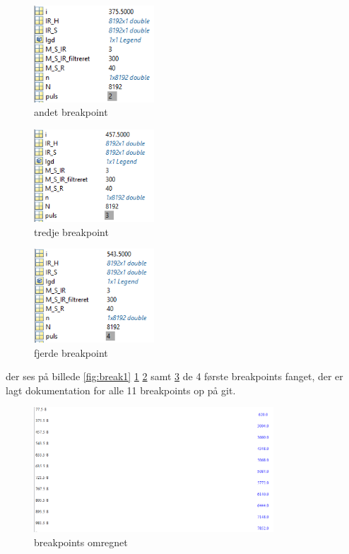 \documentclass{article}
\begin{document}
\begin{figure}[h!]
  \centering
  \includegraphics[width=0.4\textwidth]{billeder/break2.png}
  \caption{andet breakpoint}
  \label{fig:break2}
\end{figure}

\begin{figure}[h!]
  \centering
  \includegraphics[width=0.4\textwidth]{billeder/break3.png}
  \caption{tredje breakpoint}
  \label{fig:break3}
\end{figure}

\begin{figure}[h!]
  \centering
  \includegraphics[width=0.4\textwidth]{billeder/break4.png}
  \caption{fjerde breakpoint}
  \label{fig:break4}
\end{figure}

der ses på billede \ref{fig:break1} \ref{fig:break2} \ref{fig:break3} samt \ref{fig:break4} de 4 første breakpoints fanget, der er lagt dokumentation for alle 11 breakpoints op på git.

\begin{figure}[h!]
  \centering
  \includegraphics[width=0.8\textwidth]{billeder/udregning.png}
  \caption{breakpoints omregnet}
  \label{fig:udregning}
\end{figure}
\end{document}
